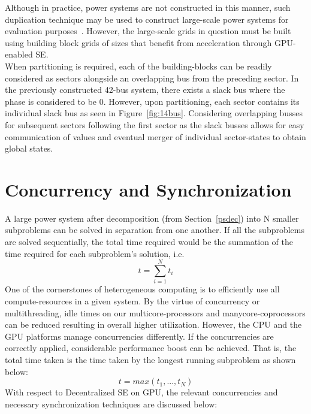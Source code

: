 \documentclass[thesis.tex]{subfiles}
\begin{document}
Although in practice, power systems are not constructed in this manner, such duplication technique may be used to construct large-scale power systems for evaluation purposes~\cite{KarimipourAcc}. However, the large-scale grids in question must be built using building block grids of sizes that benefit from acceleration through GPU-enabled SE.\\

When partitioning is required, each of the building-blocks can be readily considered as sectors alongside an overlapping bus from the preceding sector. In the previously constructed 42-bus system, there exists a slack bus where the phase is considered to be 0. However, upon partitioning, each sector contains its individual slack bus as seen in Figure~\ref{fig:14bus}. Considering overlapping busses for subsequent sectors following the first sector as the slack busses allows for easy communication of values and eventual merger of individual sector-states to obtain global states.

\section{Concurrency and Synchronization}\label{consync}
A large power system after decomposition (from Section~\ref{psdec}) into N smaller subproblems can be solved in separation from one another. If all the subproblems are solved sequentially, the total time required would be the summation of the time required for each subproblem’s solution, i.e.
\begin{equation*}
t = \sum_{i=1}^{N}t_{i}
\end{equation*}
One of the cornerstones of heterogeneous computing is to efficiently use all compute-resources in a given system. By the virtue of concurrency or multithreading, idle times on our multicore-processors and manycore-coprocessors can be reduced resulting in overall higher utilization. However, the CPU and the GPU platforms manage concurrencies differently. If the concurrencies are correctly applied, considerable performance boost can be achieved. That is, the total time taken is the time taken by the longest running subproblem as shown below:
\begin{equation*}
t = max(t_{1}, ... , t_{N})
\end{equation*}
With respect to Decentralized SE on GPU, the relevant concurrencies and necessary synchronization techniques are discussed below:
\end{document}
